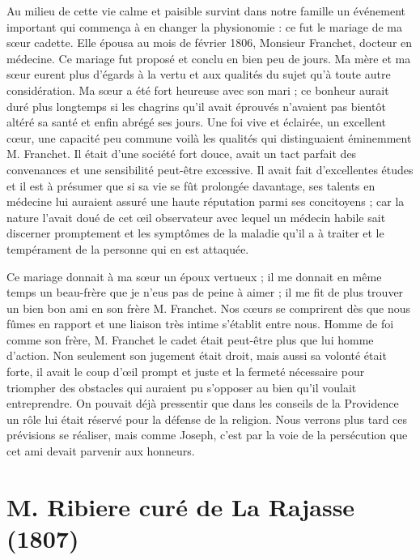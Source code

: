 \documentclass[11pt,a4paper]{report}
\begin{document}
Au milieu de cette vie calme et paisible survint dans notre famille un événement important qui commença à en changer la physionomie : ce fut le mariage de ma sœur cadette. Elle épousa au mois de février 1806, Monsieur Franchet, docteur en médecine. Ce mariage fut proposé et conclu en bien peu de jours. Ma mère et ma sœur eurent plus d'égards à la vertu et aux qualités du sujet qu'à toute autre considération. Ma sœur a été fort heureuse avec son mari ; ce bonheur aurait duré plus longtemps si les chagrins qu'il avait éprouvés n'avaient pas bientôt altéré sa santé et enfin abrégé ses jours. Une foi vive et éclairée, un excellent cœur, une capacité peu commune voilà les qualités qui distinguaient éminemment M. Franchet. Il était d'une société fort douce, avait un tact parfait des convenances et une sensibilité peut-être excessive. Il avait fait d'excellentes études et il est à présumer que si sa vie se fût prolongée davantage, ses talents en médecine lui auraient assuré une haute réputation parmi ses concitoyens ; car la nature l'avait doué de cet œil observateur avec lequel un médecin habile sait discerner promptement et les symptômes de la maladie qu'il a à traiter et le tempérament de la personne qui en est attaquée.

Ce mariage donnait à ma sœur un époux vertueux ; il me donnait en même temps un beau-frère que je n'eus pas de peine à aimer ; il me fit de plus trouver un bien bon ami en son frère M. Franchet. Nos cœurs se comprirent dès que nous fûmes en rapport et une liaison très intime s'établit entre nous. Homme de foi comme son frère, M. Franchet le cadet était peut-être plus que lui homme d'action. Non seulement son jugement était droit, mais aussi sa volonté était forte, il avait le coup d'œil prompt et juste et la fermeté nécessaire pour triompher des obstacles qui auraient pu s'opposer au bien qu'il voulait entreprendre. On pouvait déjà pressentir que dans les conseils de la Providence un rôle lui était réservé pour la défense de la religion. Nous verrons plus tard ces prévisions se réaliser, mais comme Joseph, c'est par la voie de la persécution que cet ami devait parvenir aux honneurs.

\section*{M. Ribiere curé de La Rajasse (1807)}
\end{document}
